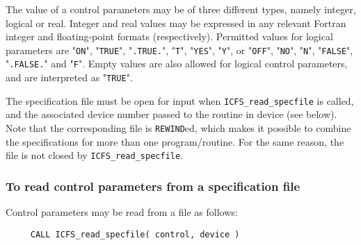 \documentclass{galahad}
\newcommand{\packagename}{ICFS}
\begin{document}
The value of a control parameters may be of three different types, namely
integer, logical or real.
Integer and real values may be expressed in any relevant Fortran integer and
floating-point formats (respectively). Permitted values for logical
parameters are "{\tt ON}", "{\tt TRUE}", "{\tt .TRUE.}", "{\tt T}", 
"{\tt YES}", "{\tt Y}", or "{\tt OFF}", "{\tt NO}",
"{\tt N}", "{\tt FALSE}", "{\tt .FALSE.}" and "{\tt F}". 
Empty values are also allowed for 
logical control parameters, and are interpreted as "{\tt TRUE}".  

The specification file must be open for 
input when {\tt \packagename\_read\_specfile}
is called, and the associated device number 
passed to the routine in device (see below). 
Note that the corresponding 
file is {\tt REWIND}ed, which makes it possible to combine the specifications 
for more than one program/routine.  For the same reason, the file is not
closed by {\tt \packagename\_read\_specfile}.

\subsubsection{To read control parameters from a specification file}
\label{readspec}

Control parameters may be read from a file as follows:
\hskip0.5in 
\def\baselinestretch{0.8} {\tt \begin{verbatim}
     CALL ICFS_read_specfile( control, device )
\end{verbatim}
}
\def\baselinestretch{1.0}
\end{document}
